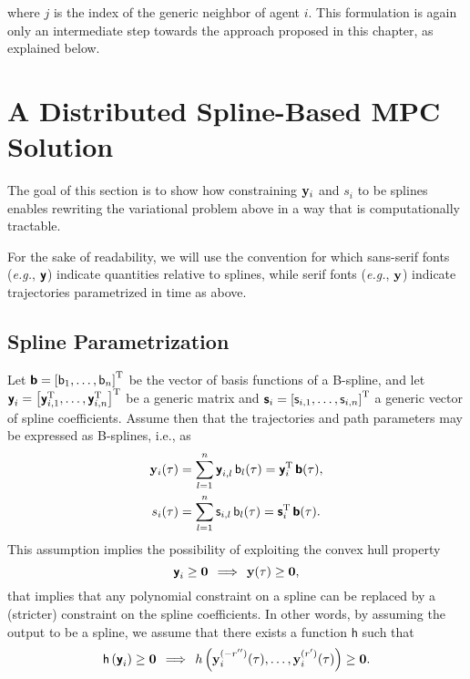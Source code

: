 \noindent where $j$ is the index of the generic neighbor of agent $i$. This formulation is again only an intermediate step towards the approach proposed in this chapter, as explained below. 



\section{A Distributed Spline-Based MPC Solution}
\label{sec:MPC_spline-based-MPC}



The goal of this section is to show how constraining $\mathbf{y}_i$ and $s_i$ to be splines enables rewriting the variational problem above in a way that is computationally tractable.

For the sake of readability, we will use the convention for which sans-serif fonts (\emph{e.g.}, $\boldsymbol{\mathsf{y}}$) indicate quantities relative to splines, while serif fonts (\emph{e.g.}, $\mathbf{y}$) indicate trajectories parametrized in time as above. %



\subsection{Spline Parametrization}
\label{ssec:MPC_spline_param}



Let $\boldsymbol{\mathsf{b}} = \left[\mathsf{b}_1, \ldots, \mathsf{b}_n\right]^{\mathrm{T}}$ be the vector of basis functions of a B-spline, and let $\boldsymbol{\mathsf{y}}_i = \left[\boldsymbol{\mathsf{y}}_{i,1}^{\mathrm{T}}, \ldots, \boldsymbol{\mathsf{y}}_{i,n}^{\mathrm{T}}\right]^{\mathrm{T}}$ be a generic matrix and $\boldsymbol{\mathsf{s}}_i = \left[\mathsf{s}_{i,1}, \ldots, \mathsf{s}_{i,n}\right]^{\mathrm{T}}$ a generic vector of spline coefficients. Assume then that the trajectories and path parameters may be expressed as B-splines, i.e., as
%
\begin{align}
    \mathbf{y}_i(\tau) &= \sum_{l=1}^n \boldsymbol{\mathsf{y}}_{i,l}\,\mathsf{b}_l(\tau) = \boldsymbol{\mathsf{y}}_i^{\mathrm{T}}\,\boldsymbol{\mathsf{b}}(\tau), \\
    s_i(\tau) &= \sum_{l=1}^n \mathsf{s}_{i,l}\,\mathsf{b}_l(\tau) = \boldsymbol{\mathsf{s}}_i^{\mathrm{T}}\,\boldsymbol{\mathsf{b}}(\tau).
\end{align}
%
This assumption implies the possibility of exploiting the convex hull property
\begin{equation}
    \boldsymbol{\mathsf{y}}_i \geq \bm{0} \, \implies \, \mathbf{y}(\tau) \geq \bm{0},
\end{equation}
that implies that any polynomial constraint on a spline can be replaced by a (stricter) constraint on the spline coefficients.
In other words, by assuming the output to be a spline, we assume that there exists a function $\mathsf{h}$ such that
\begin{equation}
    \mathsf{h}\left(\boldsymbol{\mathsf{y}}_i\right) \geq \bm{0}
    \, \implies \,
    h\left(\mathbf{y}_i^{(-r'')}(\tau), \ldots, \mathbf{y}^{(r')}_i(\tau)\right) \geq \bm{0}.
\end{equation}

